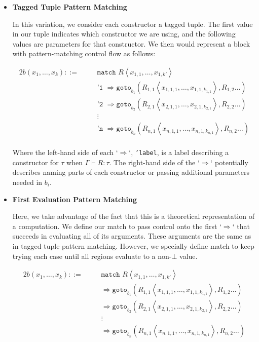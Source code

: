 \documentclass{article}
\begin{document}
\begin{itemize}
  \item \textbf{Tagged Tuple Pattern Matching}

In this variation, we consider each constructor a tagged tuple. The first value in our tuple indicates which constructor we are using, and the following values are parameters for that constructor. We then would represent a block with pattern-matching control flow as follows:

\begin{alignat*}{2}
b(x_1, \dots, x_k) ::=&\, &&\texttt{match } R \left\langle x_{1,1}, \dots, x_{1,k'} \right\rangle \\
    & &&\texttt{'1 } \Rightarrow \texttt{goto}_{b_1} \left( R_{1,1} \left\langle x_{1,1,1}, \dots, x_{1,1,k_{1,1}} \right\rangle, R_{1,2} \dots\right) \\
    & &&\texttt{'2 } \Rightarrow \texttt{goto}_{b_2} \left( R_{2,1} \left\langle x_{2,1,1}, \dots, x_{2,1,k_{2,1}} \right\rangle, R_{2,2} \dots\right) \\
    & &&\vdots \\
    & &&\texttt{'n } \Rightarrow \texttt{goto}_{b_n} \left( R_{n,1} \left\langle x_{n,1,1}, \dots, x_{n,1,k_{n,1}} \right\rangle, R_{n,2} \dots\right) \\
\end{alignat*}

Where the left-hand side of each `$\Rightarrow$`, \texttt{'label}, is a label describing a constructor for $\tau$ when $\Gamma \vdash R : \tau$. The right-hand side of the `$\Rightarrow$` potentially describes naming parts of each constructor or passing additional parameters needed in $b_i$.

\item \textbf{First Evaluation Pattern Matching}

Here, we take advantage of the fact that this is a theoretical representation of a computation. We define our match to pass control onto the first `$\Rightarrow$` that succeeds in evaluating all of its arguments. These arguments are the same as in tagged tuple pattern matching. However, we specially define match to keep trying each case until all regions evaluate to a non-$\bot$ value.

\begin{alignat*}{2}
b(x_1, \dots, x_k) ::=&\, &&\texttt{match } R \left\langle x_{1,1}, \dots, x_{1,k'} \right\rangle \\
    & && \Rightarrow \texttt{goto}_{b_1} \left( R_{1,1} \left\langle x_{1,1,1}, \dots, x_{1,1,k_{1,1}} \right\rangle, R_{1,2} \dots\right) \\
    & &&  \Rightarrow \texttt{goto}_{b_2} \left( R_{2,1} \left\langle x_{2,1,1}, \dots, x_{2,1,k_{2,1}} \right\rangle, R_{2,2} \dots\right) \\
    & && \vdots \\
    & && \Rightarrow \texttt{goto}_{b_n} \left( R_{n,1} \left\langle x_{n,1,1}, \dots, x_{n,1,k_{n,1}} \right\rangle, R_{n,2} \dots\right) \\
\end{alignat*}


\end{itemize}
\end{document}
